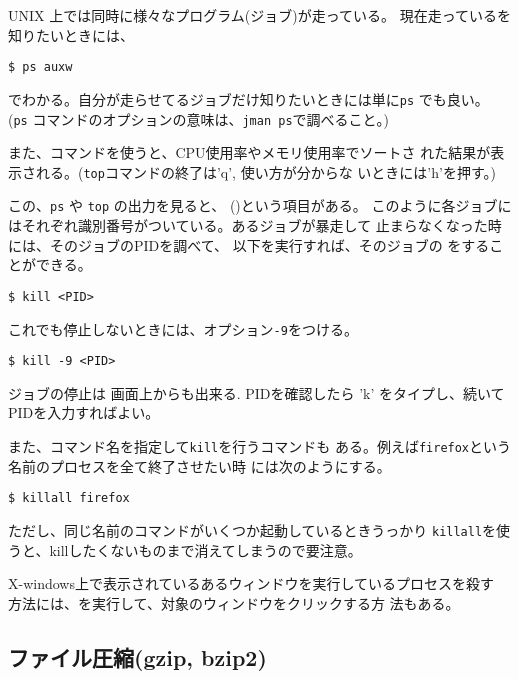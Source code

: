 \documentclass{jreport}
\begin{document}
UNIX 上では同時に様々なプログラム(ジョブ)が走っている。
現在走っているを知りたいときには、
\begin{screen}
\begin{verbatim}
$ ps auxw
\end{verbatim}
\end{screen}
でわかる。自分が走らせてるジョブだけ知りたいときには単に\verb|ps|
でも良い。
(\verb|ps| コマンドのオプションの意味は、\verb|jman ps|で調べること。)

また、コマンドを使うと、CPU使用率やメモリ使用率でソートさ
れた結果が表示される。(\verb|top|コマンドの終了は'q', 使い方が分からな
いときには'h'を押す。)

この、\verb|ps| や \verb|top| の出力を見ると、
()という項目がある。
このように各ジョブにはそれぞれ識別番号がついている。あるジョブが暴走して
止まらなくなった時には、そのジョブのPIDを調べて、
以下を実行すれば、そのジョブの
をすることができる。
\begin{screen}
\begin{verbatim}
$ kill <PID>
\end{verbatim}
\end{screen}
これでも停止しないときには、オプション\verb|-9|をつける。
\begin{screen}
\begin{verbatim}
$ kill -9 <PID>
\end{verbatim}
\end{screen}

ジョブの停止は  画面上からも出来る. PIDを確認したら 'k'
をタイプし、続いてPIDを入力すればよい。

また、コマンド名を指定して\verb|kill|を行うコマンドも
ある。例えば\verb|firefox|という名前のプロセスを全て終了させたい時
には次のようにする。
\begin{screen}
\begin{verbatim}
$ killall firefox
\end{verbatim}
\end{screen}
ただし、同じ名前のコマンドがいくつか起動しているときうっかり
\verb|killall|を使うと、killしたくないものまで消えてしまうので要注意。

X-windows上で表示されているあるウィンドウを実行しているプロセスを殺す
方法には、を実行して、対象のウィンドウをクリックする方
法もある。


\subsection{ファイル圧縮(gzip, bzip2)}
\end{document}
